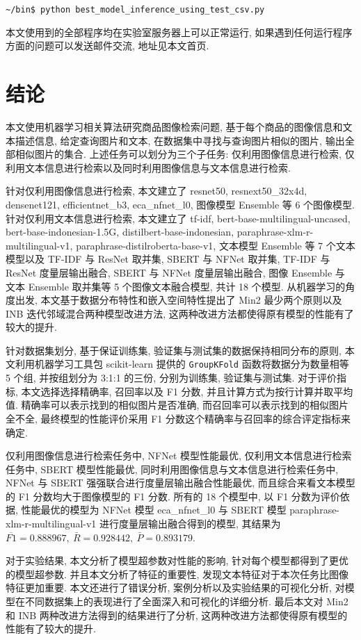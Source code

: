 \documentclass[12pt]{article}
\begin{document}
\verb|~/bin$ python best_model_inference_using_test_csv.py|

本文使用到的全部程序均在实验室服务器上可以正常运行, 如果遇到任何运行程序方面的问题可以发送邮件交流, 地址见本文首页.

\section{结论}

本文使用机器学习相关算法研究商品图像检索问题, 基于每个商品的图像信息和文本描述信息, 给定查询图片和文本, 在数据集中寻找与查询图片相似的图片, 输出全部相似图片的集合. 上述任务可以划分为三个子任务: 仅利用图像信息进行检索, 仅利用文本信息进行检索以及同时利用图像信息与文本信息进行检索. 

针对仅利用图像信息进行检索, 本文建立了 resnet50, resnext50\_32x4d, densenet121, efficientnet\_b3, eca\_nfnet\_l0, 图像模型 Ensemble 等 6 个图像模型. 针对仅利用文本信息进行检索, 本文建立了 tf-idf, bert-base-multilingual-uncased, bert-base-indonesian-1.5G, distilbert-base-indonesian, paraphrase-xlm-r-multilingual-v1, paraphrase-distilroberta-base-v1, 文本模型 Ensemble 等 7 个文本模型以及 TF-IDF 与 ResNet 取并集, SBERT 与 NFNet 取并集, TF-IDF 与 ResNet 度量层输出融合, SBERT 与 NFNet 度量层输出融合, 图像 Ensemble 与 文本 Ensemble 取并集等 5 个图像文本融合模型, 共计 18 个模型. 从机器学习的角度出发, 本文基于数据分布特性和嵌入空间特性提出了 Min2 最少两个原则以及 INB 迭代邻域混合两种模型改进方法, 这两种改进方法都使得原有模型的性能有了较大的提升.

针对数据集划分, 基于保证训练集, 验证集与测试集的数据保持相同分布的原则, 本文利用机器学习工具包 scikit-learn 提供的 \verb|GroupKFold| 函数将数据分为数量相等 5 个组, 并按组划分为 3:1:1 的三份, 分别为训练集, 验证集与测试集. 对于评价指标, 本文选择选择精确率, 召回率以及 F1 分数, 并且计算方式为按行计算并取平均值. 精确率可以表示找到的相似图片是否准确, 而召回率可以表示找到的相似图片全不全, 最终模型的性能评价采用 F1 分数这个精确率与召回率的综合评定指标来确定.

仅利用图像信息进行检索任务中, NFNet 模型性能最优, 仅利用文本信息进行检索任务中, SBERT 模型性能最优, 同时利用图像信息与文本信息进行检索任务中, NFNet 与 SBERT 强强联合进行度量层输出融合性能最优, 而且综合来看文本模型的 F1 分数均大于图像模型的 F1 分数. 所有的 18 个模型中, 以 F1 分数为评价依据, 性能最优的模型为 NFNet 模型 eca\_nfnet\_l0 与 SBERT 模型 paraphrase-xlm-r-multilingual-v1 进行度量层输出融合得到的模型, 其结果为 $\overline{F1}=0.888967,~\bar{R}=0.928442,~\bar{P}=0.893179$. 

对于实验结果, 本文分析了模型超参数对性能的影响, 针对每个模型都得到了更优的模型超参数. 并且本文分析了特征的重要性, 发现文本特征对于本次任务比图像特征更加重要. 本文还进行了错误分析, 案例分析以及实验结果的可视化分析, 对模型在不同数据集上的表现进行了全面深入和可视化的详细分析. 最后本文对 Min2 和 INB 两种改进方法得到的结果进行了分析, 这两种改进方法都使得原有模型的性能有了较大的提升.



\end{document}
